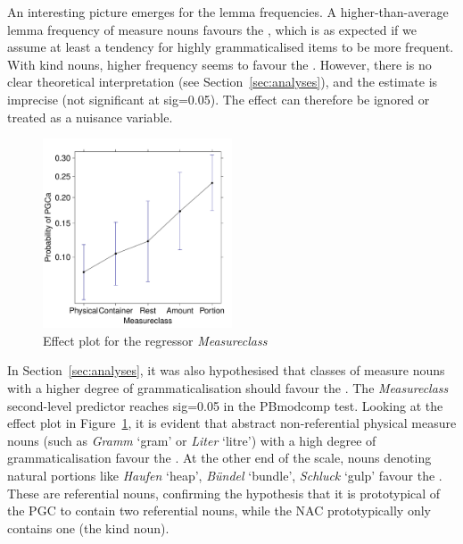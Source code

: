 An interesting picture emerges for the lemma frequencies.
A higher-than-average lemma frequency of measure nouns favours the \NACa, which is as expected if we assume at least a tendency for highly grammaticalised items to be more frequent.
With kind nouns, higher frequency seems to favour the \PGCa.
However, there is no clear theoretical interpretation (see Section~\ref{sec:analyses}), and the estimate is imprecise (not significant at sig=0.05).
The effect can therefore be ignored or treated as a nuisance variable.


\begin{figure}[h!]
  \centering
  \includegraphics[width=0.5\textwidth]{../R/output/corpus_Measureclass}
  \caption{Effect plot for the regressor \textit{Measureclass}}
  \label{fig:eff:measureattraction}
\end{figure}

In Section~\ref{sec:analyses}, it was also hypothesised that classes of measure nouns with a higher degree of grammaticalisation should favour the \NACa.
The \textit{Measureclass} second-level predictor reaches sig=0.05 in the PBmodcomp test.
Looking at the effect plot in Figure~\ref{fig:eff:measureattraction}, it is evident that abstract non-referential physical measure nouns (such as \textit{Gramm} `gram' or \textit{Liter} `litre') with a high degree of grammaticalisation favour the \NACa.
At the other end of the scale, nouns denoting natural portions like \textit{Haufen} `heap', \textit{Bündel} `bundle', \textit{Schluck} `gulp' favour the \PGCa.
These are referential nouns, confirming the hypothesis that it is prototypical of the PGC to contain two referential nouns, while the NAC prototypically only contains one (the kind noun).

